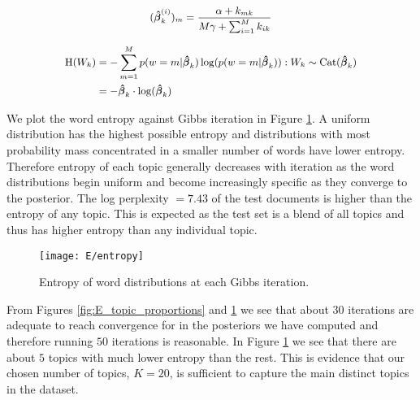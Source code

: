 \documentclass[11pt]{article}
\begin{document}
\begin{equation}
    \small
    \begin{aligned}
        (\boldsymbol{\hat \beta}_k^{(i)})_m = \frac{\alpha + k_{mk}}{M \gamma + \sum_{i=1}^{M} k_{ik}}
    \end{aligned}
    \label{eq:E_word_posterior}
\end{equation}

\begin{equation}
    \small
    \begin{aligned}
        \text{H}(W_k) &= -\sum_{m=1}^{M} p(w = m | \boldsymbol{\hat \beta}_k) \log(p(w = m | \boldsymbol{\hat \beta}_k)) : W_k \sim \text{Cat}(\boldsymbol{\hat \beta}_k) \\
          &= - \boldsymbol{\hat \beta}_k \cdot \log(\boldsymbol{\hat \beta}_k)
    \end{aligned}
    \label{eq:E_entropy}
\end{equation}

We plot the word entropy against Gibbs iteration in Figure \ref{fig:E_entropy}. A uniform distribution has the highest possible entropy and distributions with most probability mass concentrated in a smaller number of words have lower entropy. Therefore entropy of each topic generally decreases with iteration as the word distributions begin uniform and become increasingly specific as they converge to the posterior. The log perplexity $=7.43$ of the test documents is higher than the entropy of any topic. This is expected as the test set is a blend of all topics and thus has higher entropy than any individual topic.

\begin{figure}
    \centering
    \texttt{[image: E/entropy]}
    \caption{Entropy of word distributions at each Gibbs iteration.}
    \label{fig:E_entropy}
\end{figure}

From Figures \ref{fig:E_topic_proportions} and \ref{fig:E_entropy} we see that about $30$ iterations are adequate to reach convergence for in the posteriors we have computed and therefore running $50$ iterations is reasonable. In Figure \ref{fig:E_entropy} we see that there are about $5$ topics with much lower entropy than the rest. This is evidence that our chosen number of topics, $K = 20$, is sufficient to capture the main distinct topics in the dataset.
\end{document}
